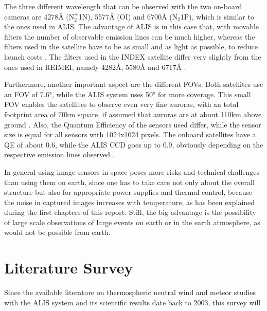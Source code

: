 The three different wavelength that can be observed with the two on-board cameras are 4278Å (N$_2^+$1N), 5577Å (OI) and 6700Å (N$_2$1P), which is similar to the ones used in ALIS. The advantage of ALIS is in this case that, with movable filters the number of observable emission lines can be much higher, whereas the filters used in the satellite have to be as small and as light as possible, to reduce launch costs \citep{obuchi2008initial}.
The filters used in the INDEX satellite differ very slightly from the ones used in REIMEI, namely 4282Å, 5580Å and 6717Å \citep{sakanoi2003development}.

Furthermore, another important aspect are the different FOVs. Both satellites use an FOV of 7.6°, while the ALIS system uses 50° for more coverage. This small FOV enables the satellites to observe even very fine auroras, with an total footprint area of 70km square, if assumed that auroras are at about 110km above ground \citep{obuchi2008initial}.
Also, the Quantum Efficiency of the sensors used differ, while the sensor size is equal for all sensors with 1024x1024 pixels. The onboard satellites have a QE of about 0.6, while the ALIS CCD goes up to 0.9, obviously depending on the respective emission lines observed \citep{obuchi2008initial,brandstrom2003auroral}.

In general using image sensors in space poses more risks and technical challenges than using them on earth, since one has to take care not only about the overall structure but also for appropriate power supplies and thermal control, because the noise in captured images increases with temperature, as has been explained during the first chapters of this report. Still, the big advantage is the possibility of large scale observations of large events on earth or in the earth atmosphere, as would not be possible from earth.

\section{Literature Survey}
Since the available literature on thermospheric neutral wind and meteor studies with the ALIS system and its scientific results date back to 2003, this survey will




